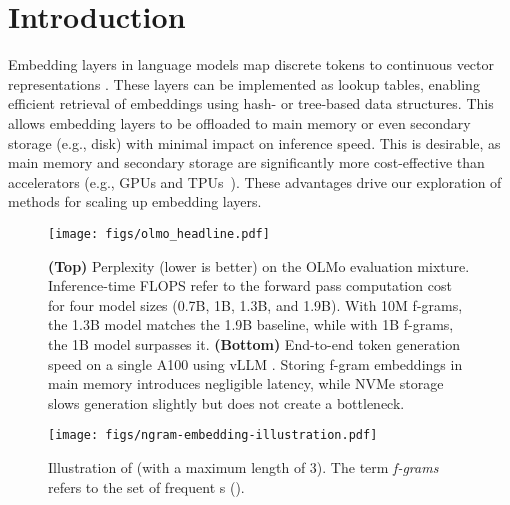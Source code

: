 

\section{Introduction}\label{sec:intro}

Embedding layers in language models map discrete tokens to continuous vector representations \citep{mikolov2013efficient, sennrich2015neural}. These layers can be implemented as lookup tables, enabling efficient retrieval of embeddings using hash- or tree-based data structures.
This allows embedding layers to be offloaded to main memory or even secondary storage (e.g., disk) with minimal impact on inference speed. This is desirable, as main memory and secondary storage are significantly more cost-effective than accelerators (e.g., GPUs and TPUs~\citep{memory_disk_price}). These advantages drive our exploration of methods for scaling up embedding layers.

\begin{figure}[!t]
    \centering
    \texttt{[image: figs/olmo\_headline.pdf]}
    \caption{\small \textbf{(Top)} Perplexity (lower is better) on the OLMo \citep{OLMo} evaluation mixture. Inference-time FLOPS refer to the forward pass computation cost for four model sizes (0.7B, 1B, 1.3B, and 1.9B). With 10M f-grams, the 1.3B model matches the 1.9B baseline, while with 1B f-grams, the 1B model surpasses it. \textbf{(Bottom)} End-to-end token generation speed on a single A100 using vLLM \citep{kwon2023efficient}. Storing f-gram embeddings in main memory introduces negligible latency, while NVMe storage slows generation slightly but does not create a bottleneck.}
    \label{fig:olmo_scaling_result}
\end{figure}



\begin{figure*}[ht]
    \centering
    \texttt{[image: figs/ngram-embedding-illustration.pdf]}
    \caption{Illustration of \SCONE (with a maximum  length of $3$). The term {\em f-grams} refers to the set of frequent s ().}
    \label{fig:method_overview}
\end{figure*}



